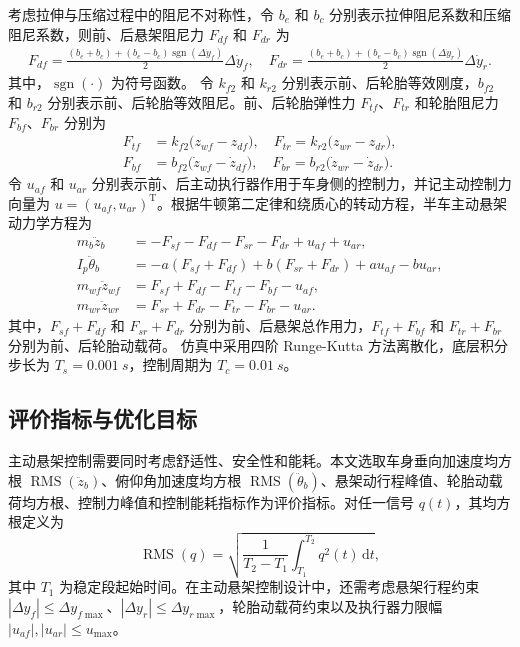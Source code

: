 考虑拉伸与压缩过程中的阻尼不对称性，令 $b_e$ 和 $b_c$ 分别表示拉伸阻尼系数和压缩阻尼系数，则前、后悬架阻尼力 $F_{df}$ 和 $F_{dr}$ 为
\begin{align}
F_{df} =
\frac{(b_e+b_c)+(b_e-b_c)\operatorname{sgn}(\Delta\dot y_f)}{2}\Delta\dot y_f,  \quad
F_{dr} =
\frac{(b_e+b_c)+(b_e-b_c)\operatorname{sgn}(\Delta\dot y_r)}{2}\Delta\dot y_r.
\label{eq:susp_damping_force}
\end{align}
其中，$\operatorname{sgn}(\cdot)$ 为符号函数。
令 $k_{f2}$ 和 $k_{r2}$ 分别表示前、后轮胎等效刚度，$b_{f2}$ 和 $b_{r2}$ 分别表示前、后轮胎等效阻尼。前、后轮胎弹性力 $F_{tf}$、$F_{tr}$ 和轮胎阻尼力 $F_{bf}$、$F_{br}$ 分别为
\begin{align}
F_{tf} &= k_{f2}\bigl(z_{wf}-z_{df}\bigr), \quad F_{tr} = k_{r2}\bigl(z_{wr}-z_{dr}\bigr), \label{eq:tire_stiffness_force}\\
F_{bf} &= b_{f2}\bigl(\dot z_{wf}-\dot z_{df}\bigr), \quad F_{br} = b_{r2}\bigl(\dot z_{wr}-\dot z_{dr}\bigr). \label{eq:tire_damping_force}
\end{align}
令 $u_{af}$ 和 $u_{ar}$ 分别表示前、后主动执行器作用于车身侧的控制力，并记主动控制力向量为 $u=(u_{af},u_{ar})^{\mathrm T}$。根据牛顿第二定律和绕质心的转动方程，半车主动悬架动力学方程为
\begin{align}
m_b\ddot z_b &= -F_{sf}-F_{df}-F_{sr}-F_{dr}+u_{af}+u_{ar}, \label{eq:body}\\
I_p\ddot\theta_b &= -a(F_{sf}+F_{df})+b(F_{sr}+F_{dr})+a u_{af}-b u_{ar}, \label{eq:pitch}\\
m_{wf}\ddot z_{wf} &= F_{sf}+F_{df}-F_{tf}-F_{bf}-u_{af}, \label{eq:front_wheel}\\
m_{wr}\ddot z_{wr} &= F_{sr}+F_{dr}-F_{tr}-F_{br}-u_{ar}. \label{eq:rear_wheel}
\end{align}
其中，$F_{sf}+F_{df}$ 和 $F_{sr}+F_{dr}$ 分别为前、后悬架总作用力，$F_{tf}+F_{bf}$ 和 $F_{tr}+F_{br}$ 分别为前、后轮胎动载荷。
仿真中采用四阶 Runge-Kutta 方法离散化，底层积分步长为 $T_s=\SI{0.001}{s}$，控制周期为 $T_c=\SI{0.01}{s}$。

\subsection{评价指标与优化目标}
主动悬架控制需要同时考虑舒适性、安全性和能耗。本文选取车身垂向加速度均方根 $\operatorname{RMS}(\ddot z_b)$、俯仰角加速度均方根 $\operatorname{RMS}(\ddot\theta_b)$、悬架动行程峰值、轮胎动载荷均方根、控制力峰值和控制能耗指标作为评价指标。对任一信号 $q(t)$，其均方根定义为
\begin{equation}
\operatorname{RMS}(q)=\sqrt{\frac{1}{T_2-T_1}\int_{T_1}^{T_2}q^2(t)\,\mathrm dt},
\label{eq:rms}
\end{equation}
其中 $T_1$ 为稳定段起始时间。在主动悬架控制设计中，还需考虑悬架行程约束 $|\Delta y_f|\le\Delta y_{f\max}$、$|\Delta y_r|\le\Delta y_{r\max}$，轮胎动载荷约束以及执行器力限幅 $|u_{af}|,|u_{ar}|\le u_{\max}$。

